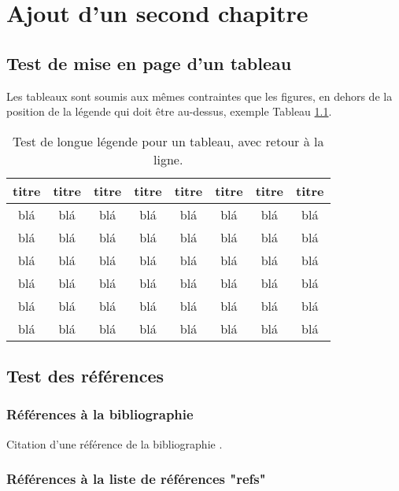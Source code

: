 \chapter{Ajout d'un second chapitre}

\section{Test de mise en page d'un tableau}

Les tableaux sont soumis aux mêmes contraintes que les figures, en dehors de la position de la légende qui doit être au-dessus, exemple Tableau \ref{chap2:tableau1}.

\begin{table}
    \parbox{0.65\textwidth}{%
    \caption{Test de longue légende pour un tableau, avec retour à la ligne.}%
    \label{chap2:tableau1}%
    } %
    \begin{tabular}{|c|c|c|c|c|c|c|c|}
	\hline
		      {\bf titre} & {\bf titre} & {\bf titre} & {\bf titre} & {\bf titre} & {\bf titre} & {\bf titre} & {\bf titre} \\
	  \hline
			blá & blá & blá & blá & blá & blá & blá & blá \\
	  \hline
			blá & blá & blá & blá & blá & blá & blá & blá \\
	  \hline
			blá & blá & blá & blá & blá & blá & blá & blá \\
	  \hline
			blá & blá & blá & blá & blá & blá & blá & blá \\
	  \hline
			blá & blá & blá & blá & blá & blá & blá & blá \\
	  \hline
			blá & blá & blá & blá & blá & blá & blá & blá \\
	  \hline
    \end{tabular}
\end{table}


\section{Test des références}

\subsection{Références à la bibliographie}

Citation d'une référence de la bibliographie \citep{BookExample}.

\subsection{Références à la liste de références "refs"}


